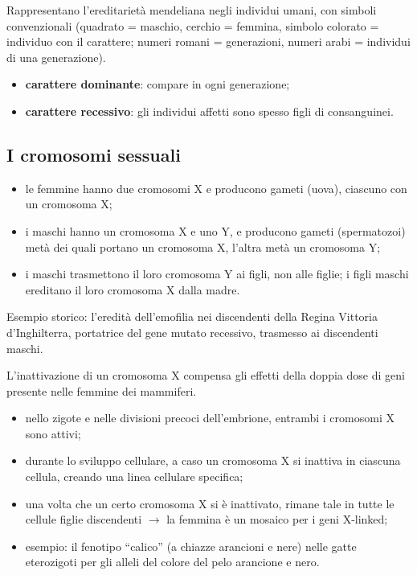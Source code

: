 Rappresentano l'ereditarietà mendeliana negli individui umani, con simboli convenzionali (quadrato = maschio, cerchio = femmina, simbolo colorato = individuo con il carattere; numeri romani = generazioni, numeri arabi = individui di una generazione).
\begin{itemize}
  \item \textbf{carattere dominante}: compare in ogni generazione;
  \item \textbf{carattere recessivo}: gli individui affetti sono spesso figli di consanguinei.
\end{itemize}

\subsection{I cromosomi sessuali}

\begin{itemize}
  \item le femmine hanno due cromosomi X e producono gameti (uova), ciascuno con un cromosoma X;
  \item i maschi hanno un cromosoma X e uno Y, e producono gameti (spermatozoi) metà dei quali portano un cromosoma X, l'altra metà un cromosoma Y;
  \item i maschi trasmettono il loro cromosoma Y ai figli, non alle figlie; i figli maschi ereditano il loro cromosoma X dalla madre.
\end{itemize}

Esempio storico: l'eredità dell'emofilia nei discendenti della Regina Vittoria d'Inghilterra, portatrice del gene mutato recessivo, trasmesso ai discendenti maschi.

L'inattivazione di un cromosoma X compensa gli effetti della doppia dose di geni presente nelle femmine dei mammiferi.
\begin{itemize}
  \item nello zigote e nelle divisioni precoci dell'embrione, entrambi i cromosomi X sono attivi;
  \item durante lo sviluppo cellulare, a caso un cromosoma X si inattiva in ciascuna cellula, creando una linea cellulare specifica;
  \item una volta che un certo cromosoma X si è inattivato, rimane tale in tutte le cellule figlie discendenti $\rightarrow$ la femmina è un mosaico per i geni X-linked;
  \item esempio: il fenotipo ``calico'' (a chiazze arancioni e nere) nelle gatte eterozigoti per gli alleli del colore del pelo arancione e nero.
\end{itemize}

